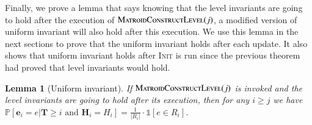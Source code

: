 \documentclass[11pt]{article}
\newtheorem{lemma}[theorem]{Lemma}
\renewcommand{\Pr}[1]{\ensuremath{\mathbb{P}\left[#1\right]}}
\newcommand{\ind}[1]{\ensuremath{\mathds{1}\left[#1\right]}}
\newcommand{\init}{\textsc{Init}}
\newcommand{\MatroidConstLevel}{\textsc{MatroidConstructLevel}}
\newcommand{\bE}{\ensuremath{\mathbf{e}}}
\newcommand{\bT}{\ensuremath{\mathbf{T}}}
\newcommand{\bH}{\ensuremath{\mathbf{H}}}
\begin{document}
Finally, we prove a lemma that says knowing that the level invariants are going to hold after the execution of $\MatroidConstLevel{}(j)$, 
a modified version of uniform invariant will also hold after this execution. We use this lemma in the next sections to prove that the uniform invariant holds after each update. It also shows that uniform invariant holds after \init{} is run since the previous theorem had proved that level invariants would hold. 

\begin{lemma}[Uniform invariant]
\label{lm:uniform:leveling}
If $\MatroidConstLevel{}(j)$ is invoked and 
the level invariants are going to hold after its execution, then for any $i \ge j$ we have $ \Pr{\bE_i = e |  \bT \geq i \text{ and } \bH_i = H_i  }= \frac{1}{|R_i|}\cdot \ind{e\in R_i}  $.
\end{lemma}
\end{document}
